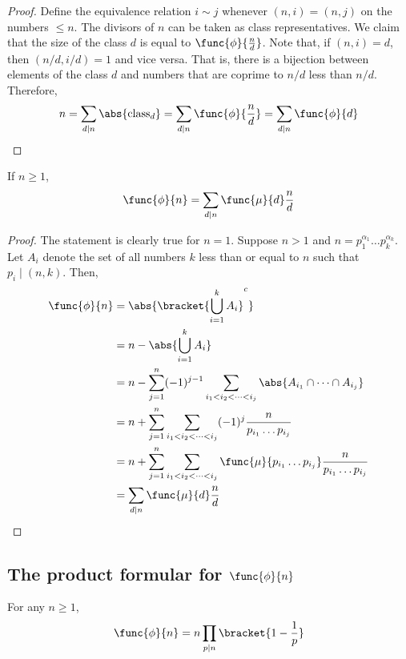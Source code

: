 \begin{proof}
    Define the equivalence relation \(i \sim j\) whenever \((n,i) = (n,j)\) on the numbers \(\leq n\). The divisors of \(n\) can be taken as class representatives. We claim that the size of the class \(d\) is equal to \(\func{\phi}{\frac{n}{d}}\). Note that, if \((n,i) = d\), then \((n/d, i/d) = 1\) and vice versa. That is, there is a bijection between elements of the class \(d\) and numbers that are coprime to \(n/d\) less than \(n/d\). Therefore,
    \begin{equation*}
        n = \sum_{d \mid n} \abs{\text{class}_d} = \sum_{d \mid n } \func{\phi}{\frac{n}{d}} = \sum_{d \mid n} \func{\phi}{d}
    \end{equation*}
\end{proof}

\begin{theorem}
    If \(n \geq 1\), 
    \begin{equation*}
        \func{\phi}{n} = \sum_{d \mid n} \func{\mu}{d} \frac{n}{d}
    \end{equation*}
\end{theorem}

\begin{proof}
    The statement is clearly true for \(n = 1\). Suppose \(n > 1\) and \(n = p_1^{\alpha_1} \dots p_k^{\alpha_k}\). Let \(A_i\) denote the set of all numbers \(k\) less than or equal to \(n\) such that \(p_i \mid (n,k)\). Then, 
    \begin{align*}
        \func{\phi}{n} &= \abs{\bracket{\bigcup_{i = 1}^k A_i}^c} \\
        &= n - \abs{\bigcup_{i = 1}^k A_i}\\
        &= n - \sum_{j = 1}^n (-1)^{j-1}\sum_{i_1 < i_2 < \dots < i_j}  \abs{A_{i_1} \cap \dots \cap A_{i_j}}\\
        &= n + \sum_{j = 1}^n \sum_{i_1 < i_2 < \dots < i_j}  (-1)^{j} \dfrac{n}{p_{i_1} \dots p_{i_j}}\\
        &= n + \sum_{j = 1}^n \sum_{i_1 < i_2 < \dots < i_j} \func{\mu}{p_{i_1} \dots p_{i_j}}  \dfrac{n}{p_{i_1} \dots p_{i_j}}\\
        &= \sum_{d \mid n} \func{\mu}{d}  \dfrac{n}{d}
    \end{align*}
\end{proof}

\subsection{The product formular for \(\func{\phi}{n}\)}
\begin{theorem}
    For any \(n \geq 1\),
    \begin{equation*}
        \func{\phi}{n} = n \prod_{p \mid n}\bracket{1 - \dfrac{1}{p}}
    \end{equation*}
\end{theorem}

